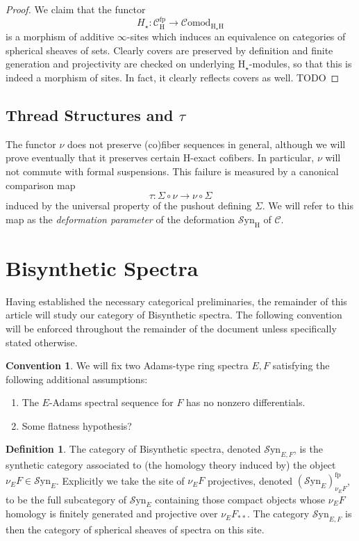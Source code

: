 \documentclass[10pt]{amsart}
\theoremstyle{definition}
\numberwithin{figure}{section}
\numberwithin{equation}{section}
\newtheorem{definition}[figure]{Definition}
\newtheorem{convention}[figure]{Convention}
\newcommand{\cC}{\mathcal{C}}
\theoremstyle{cited}
\newcommand{\fp}{\mathrm{fp}}
\newcommand{\Syn}{\mathcal{S}\mathrm{yn}}
\renewcommand{\H}{\mathrm{H}}
\newcommand{\Comod}{\mathcal{C}\mathrm{omod}}
\begin{document}
\begin{proof}
  We claim that the functor
  \[
  H_\star:\cC_\H^\fp \to \Comod_{\H_\star\H}
  \]
  is a morphism of additive $\infty$-sites which induces an equivalence on categories of spherical sheaves of sets. Clearly covers are preserved by definition and finite generation and projectivity are checked on underlying $\H_\star$-modules, so that this is indeed a morphism of sites. In fact, it clearly reflects covers as well. TODO
\end{proof}


\subsection{Thread Structures and $\tau$}

The functor $\nu$ does not preserve (co)fiber sequences in general, although we will prove eventually that it preserves certain $\H$-exact cofibers. In particular, $\nu$ will not commute with formal suspensions. This failure is measured by a canonical comparison map
\[
\tau: \Sigma \circ \nu \to \nu \circ \Sigma
\]
induced by the universal property of the pushout defining $\Sigma$. We will refer to this map as the \textit{deformation parameter} of the deformation $\Syn_\H$ of $\cC$. 



\section{Bisynthetic Spectra}

Having established the necessary categorical preliminaries, the remainder of this article will study our category of Bisynthetic spectra. The following convention will be enforced throughout the remainder of the document unless specifically stated otherwise. 

\begin{convention}
  We will fix two Adams-type ring spectra $E,F$ satisfying the following additional assumptions:
  \begin{enumerate}
      \item The $E$-Adams spectral sequence for $F$ has no nonzero differentials.
      \item Some flatness hypothesis?
  \end{enumerate}
\end{convention}

\begin{definition}
  The category of Bisynthetic spectra, denoted $\Syn_{E,F}$, is the synthetic category associated to (the homology theory induced by) the object $\nu_E F\in \Syn_E$. Explicitly we take the site of $\nu_E F$ projectives, denoted $(\Syn_E)_{\nu_E F}^\fp$, to be the full subcategory of $\Syn_E$ containing those compact objects whose $\nu_E F$ homology is finitely generated and projective over $\nu_E F_{**}$. The category $\Syn_{E,F}$ is then the category of spherical sheaves of spectra on this site.
\end{definition}
\end{document}

